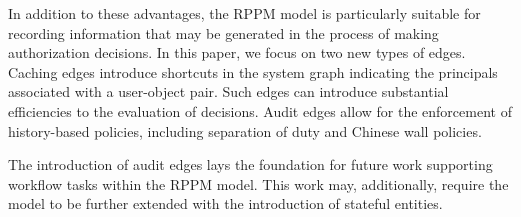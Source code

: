 \documentclass{article}
\begin{document}
In addition to these advantages, the RPPM model is particularly suitable for recording information that may be generated in the process of making authorization decisions.
In this paper, we focus on two new types of edges.
Caching edges introduce shortcuts in the system graph indicating the principals associated with a user-object pair.
Such edges can introduce substantial efficiencies to the evaluation of decisions.
Audit edges allow for the enforcement of history-based policies, including separation of duty and Chinese wall policies.

The introduction of audit edges lays the foundation for future work supporting workflow tasks within the RPPM model.
This work may, additionally, require the model to be further extended with the introduction of stateful entities.



\end{document}
